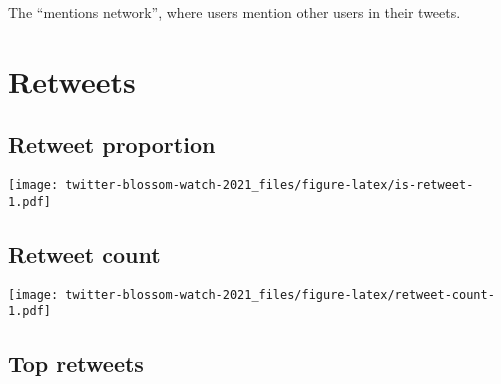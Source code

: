 \documentclass[
]{article}
\begin{document}
The ``mentions network'', where users mention other users in their
tweets.

\hypertarget{retweets}{%
\section{Retweets}\label{retweets}}

\hypertarget{retweet-proportion}{%
\subsection{Retweet proportion}\label{retweet-proportion}}

\texttt{[image: twitter-blossom-watch-2021\_files/figure-latex/is-retweet-1.pdf]}

\hypertarget{retweet-count}{%
\subsection{Retweet count}\label{retweet-count}}

\texttt{[image: twitter-blossom-watch-2021\_files/figure-latex/retweet-count-1.pdf]}

\hypertarget{top-retweets}{%
\subsection{Top retweets}\label{top-retweets}}
\end{document}
